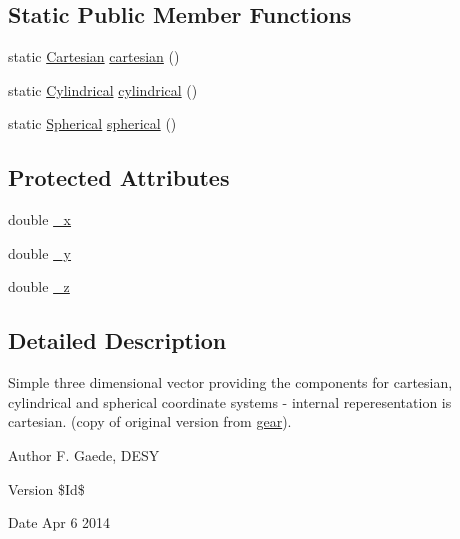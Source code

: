 \subsection*{Static Public Member Functions}
\begin{DoxyCompactItemize}
\item 
static \hyperlink{struct_d_d_surfaces_1_1_vector3_d_1_1_cartesian}{Cartesian} \hyperlink{class_d_d_surfaces_1_1_vector3_d_a983814268a129992e3010f4964cd2b63}{cartesian} ()
\item 
static \hyperlink{struct_d_d_surfaces_1_1_vector3_d_1_1_cylindrical}{Cylindrical} \hyperlink{class_d_d_surfaces_1_1_vector3_d_aa9467dc445dfa66633113f4d17dd3be8}{cylindrical} ()
\item 
static \hyperlink{struct_d_d_surfaces_1_1_vector3_d_1_1_spherical}{Spherical} \hyperlink{class_d_d_surfaces_1_1_vector3_d_a2c73305f5aef051f55f33b721a68b660}{spherical} ()
\end{DoxyCompactItemize}
\subsection*{Protected Attributes}
\begin{DoxyCompactItemize}
\item 
double \hyperlink{class_d_d_surfaces_1_1_vector3_d_a9891648fe605155ece38f3b9c9dd687d}{\_\-x}
\item 
double \hyperlink{class_d_d_surfaces_1_1_vector3_d_a69ad9a281ca55cd4b1e9959265855a97}{\_\-y}
\item 
double \hyperlink{class_d_d_surfaces_1_1_vector3_d_a8cfed9e9ca399b20c9b4d3bbb5692bc9}{\_\-z}
\end{DoxyCompactItemize}


\subsection{Detailed Description}
Simple three dimensional vector providing the components for cartesian, cylindrical and spherical coordinate systems -\/ internal reperesentation is cartesian. (copy of original version from \hyperlink{namespacegear}{gear}).

\begin{DoxyAuthor}{Author}
F. Gaede, DESY 
\end{DoxyAuthor}
\begin{DoxyVersion}{Version}
\$Id\$ 
\end{DoxyVersion}
\begin{DoxyDate}{Date}
Apr 6 2014 
\end{DoxyDate}


